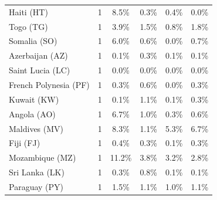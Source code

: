 {\begin{table}[ht]
{\begin{tabular}{lccccc}
Haiti (HT)            &     1  & \cellcolor{red5}  8.5\% & \cellcolor{green1} 0.3\% & \cellcolor{green1} 0.4\% & \cellcolor{green1} 0.0\% \\  %
Togo (TG)             &     1  & \cellcolor{red5}  3.9\% & \cellcolor{green0} 1.5\% & \cellcolor{green5}  0.8\% & 1.8\% \\  %
Somalia (SO)          &     1  & \cellcolor{red5}  6.0\% & \cellcolor{green1} 0.6\% & \cellcolor{green1} 0.0\% & \cellcolor{green0} 0.7\% \\  %
Azerbaijan (AZ)       &     1  & \cellcolor{green1} 0.1\% & \cellcolor{red5}  0.3\% & \cellcolor{green1} 0.1\% & \cellcolor{green1} 0.1\% \\  %
Saint Lucia (LC)      &     1  & \cellcolor{green5}  0.0\% & \cellcolor{green5}  0.0\% & \cellcolor{green5}  0.0\% & \cellcolor{green5}  0.0\% \\  %
French Polynesia (PF)  &     1  & 0.3\% & \cellcolor{red5}  0.6\% & \cellcolor{green5}  0.0\% & 0.3\% \\  %
Kuwait (KW)           &     1  & \cellcolor{green1} 0.1\% & \cellcolor{red5}  1.1\% & \cellcolor{green1} 0.1\% & \cellcolor{green0} 0.3\% \\  %
Angola (AO)           &     1  & \cellcolor{red5}  6.7\% & \cellcolor{green0} 1.0\% & \cellcolor{green1} 0.3\% & \cellcolor{green1} 0.6\% \\  %
Maldives (MV)         &     1  & \cellcolor{red5}  8.3\% & \cellcolor{green5}  1.1\% & 5.3\% & \cellcolor{red1} 6.7\% \\  %
Fiji (FJ)             &     1  & \cellcolor{red5}  0.4\% & 0.3\% & \cellcolor{green5}  0.1\% & 0.3\% \\  %
Mozambique (MZ)       &     1  & \cellcolor{red5}  11.2\% & \cellcolor{green0} 3.8\% & \cellcolor{green1} 3.2\% & \cellcolor{green1} 2.8\% \\  %
Sri Lanka (LK)        &     1  & 0.3\% & \cellcolor{red5}  0.8\% & \cellcolor{green1} 0.1\% & \cellcolor{green1} 0.1\% \\  %
Paraguay (PY)         &     1  & \cellcolor{red5}  1.5\% & \cellcolor{green0} 1.1\% & \cellcolor{green5}  1.0\% & \cellcolor{green0} 1.1\% \\  %

\end{tabular}}
\end{table}}
